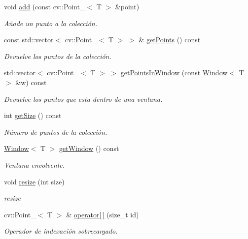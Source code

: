 \begin{DoxyCompactItemize}
void \hyperlink{group___geometric_entities_ga9199a5fd8948e1f456cb0a47f72f99b7}{add} (const cv\+::\+Point\+\_\+$<$ T $>$ \&point)
\begin{DoxyCompactList}\small\item\em Añade un punto a la colección. \end{DoxyCompactList}\item 
const std\+::vector$<$ cv\+::\+Point\+\_\+$<$ T $>$ $>$ \& \hyperlink{class_i3_d_1_1_multi_point_a9b3d49d95f7ca38a48910eb9e419d6d7}{get\+Points} () const 
\begin{DoxyCompactList}\small\item\em Devuelve los puntos de la colección. \end{DoxyCompactList}\item 
std\+::vector$<$ cv\+::\+Point\+\_\+$<$ T $>$ $>$ \hyperlink{group___geometric_entities_ga2985cb5eede5d9631f87d50aaec4ca5c}{get\+Points\+In\+Window} (const \hyperlink{class_i3_d_1_1_window}{Window}$<$ T $>$ \&w) const 
\begin{DoxyCompactList}\small\item\em Devuelve los puntos que esta dentro de una ventana. \end{DoxyCompactList}\item 
int \hyperlink{class_i3_d_1_1_multi_point_a1ca5ac1c6908662f4df1b34cf70b2b17}{get\+Size} () const 
\begin{DoxyCompactList}\small\item\em Número de puntos de la colección. \end{DoxyCompactList}\item 
\hyperlink{class_i3_d_1_1_window}{Window}$<$ T $>$ \hyperlink{group___geometric_entities_ga25a83a5c3a0477ef6ee6c339cda6c4e7}{get\+Window} () const 
\begin{DoxyCompactList}\small\item\em Ventana envolvente. \end{DoxyCompactList}\item 
void \hyperlink{class_i3_d_1_1_multi_point_abb806a4c8c4e578f5ee440e1f30748a1}{resize} (int size)
\begin{DoxyCompactList}\small\item\em resize \end{DoxyCompactList}\item 
cv\+::\+Point\+\_\+$<$ T $>$ \& \hyperlink{class_i3_d_1_1_multi_point_a24be0acec8e96b6479675b4bfbd0f365}{operator\mbox{[}$\,$\mbox{]}} (size\+\_\+t id)
\begin{DoxyCompactList}\small\item\em Operador de indexación sobrecargado. \end{DoxyCompactList}\end{DoxyCompactItemize}



